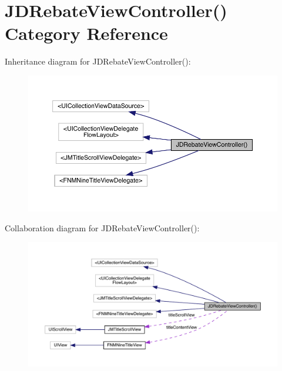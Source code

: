\hypertarget{category_j_d_rebate_view_controller_07_08}{}\section{J\+D\+Rebate\+View\+Controller() Category Reference}
\label{category_j_d_rebate_view_controller_07_08}


Inheritance diagram for J\+D\+Rebate\+View\+Controller()\+:\nopagebreak
\begin{figure}[H]
\begin{center}
\leavevmode
\includegraphics[width=350pt]{category_j_d_rebate_view_controller_07_08__inherit__graph}
\end{center}
\end{figure}


Collaboration diagram for J\+D\+Rebate\+View\+Controller()\+:\nopagebreak
\begin{figure}[H]
\begin{center}
\leavevmode
\includegraphics[width=350pt]{category_j_d_rebate_view_controller_07_08__coll__graph}
\end{center}
\end{figure}
